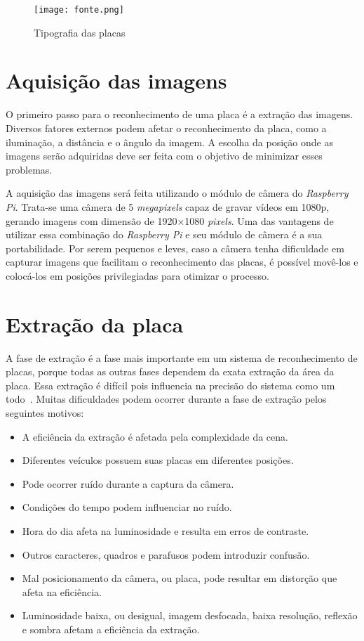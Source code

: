 \begin{figure}[H]
	\centering
	\texttt{[image: fonte.png]}
	\caption{Tipografia das placas}
	\label{fig:tipografia}
\end{figure}

\section{Aquisição das imagens}
\label{sec:aquisicao}

O primeiro passo para o reconhecimento de uma placa é a extração das imagens.
Diversos fatores externos podem afetar o reconhecimento da placa, como a
iluminação, a distância e o ângulo da imagem. A escolha da posição onde as
imagens serão adquiridas deve ser feita com o objetivo de minimizar esses
problemas.

A aquisição das imagens será feita utilizando o módulo de câmera do
\emph{Raspberry Pi}. Trata-se uma câmera de 5 \emph{megapixels} capaz de gravar
vídeos em 1080p, gerando imagens com dimensão de 1920×1080 \emph{pixels}. Uma
das vantagens de utilizar essa combinação do \emph{Raspberry Pi} e seu módulo de
câmera é a sua portabilidade. Por serem pequenos e leves, caso a câmera tenha
dificuldade em capturar imagens que facilitam o reconhecimento das placas, é
possível movê-los e colocá-los em posições privilegiadas para otimizar o
processo.

\section{Extração da placa}
\label{sec:extracao}

A fase de extração é a fase mais importante em um sistema de reconhecimento de
placas, porque todas as outras fases dependem da exata extração da área da
placa. Essa extração é difícil pois influencia na precisão do sistema como um
todo~\cite{kaur2014efficient}. Muitas dificuldades podem ocorrer durante a fase
de extração pelos seguintes motivos:

\begin{itemize}
	\item A eficiência da extração é afetada pela complexidade da cena.
	\item Diferentes veículos possuem suas placas em diferentes posições.
	\item Pode ocorrer ruído durante a captura da câmera.
	\item Condições do tempo podem influenciar no ruído.
	\item Hora do dia afeta na luminosidade e resulta em erros de contraste.
	\item Outros caracteres, quadros e parafusos podem introduzir confusão.
	\item Mal posicionamento da câmera, ou placa, pode resultar em distorção que afeta na eficiência.
	\item Luminosidade baixa, ou desigual, imagem desfocada, baixa resolução, reflexão e sombra afetam a eficiência da extração.
\end{itemize}

